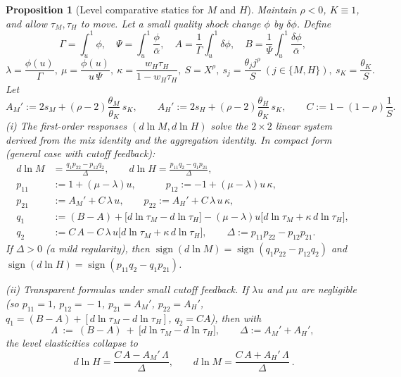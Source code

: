 \documentclass[english]{article}
\newtheorem{proposition}{Proposition}
\begin{document}
\begin{proposition}[Level comparative statics for $M$ and $H$]\label{prop:levels}
Maintain $\rho<0$, $K\equiv1$, and allow $\tau_M,\tau_H$ to move. Let a small quality shock change $\phi$ by $\delta\phi$.
Define
\[
\Gamma=\int_u^1\phi,\quad \Psi=\int_u^1\frac{\phi}{\bar\alpha},\quad
A=\frac{1}{\Gamma}\int_u^1\delta\phi,\quad B=\frac{1}{\Psi}\int_u^1\frac{\delta\phi}{\bar\alpha},
\]
\[
\lambda=\frac{\phi(u)}{\Gamma},\ \mu=\frac{\phi(u)}{u\,\Psi},\ 
\kappa=\frac{w_H\tau_H}{1-w_H\tau_H},\ 
S=X^\rho,\ 
s_j=\frac{\theta_j j^\rho}{S}\ (j\in\{M,H\}),\ s_K=\frac{\theta_K}{S}.
\]
Let
\[
A_M':=2s_M+(\rho-2)\frac{\theta_M}{\theta_K}\,s_K,\qquad
A_H':=2s_H+(\rho-2)\frac{\theta_H}{\theta_K}\,s_K,\qquad
C:=1-(1-\rho)\frac{1}{S}.
\]
(i) The first-order responses $(d\ln M,d\ln H)$ solve the $2\times2$ linear system derived from the
mix identity and the aggregation identity. In compact form (general case with cutoff feedback):
\[
\begin{aligned}
d\ln M&=\frac{q_1 p_{22}-p_{12}q_2}{\Delta},\qquad
d\ln H=\frac{p_{11}q_2-q_1 p_{21}}{\Delta},
\\[-2pt]
p_{11}&:=1+(\mu-\lambda)u,\qquad\quad
p_{12}:=-1+(\mu-\lambda)u\,\kappa,
\\[-2pt]
p_{21}&:=A_M'+C\,\lambda\,u,\qquad
p_{22}:=A_H'+C\,\lambda\,u\,\kappa,
\\[-2pt]
q_1&:=(B-A)+\big[d\ln\tau_M-d\ln\tau_H\big] - (\mu-\lambda)u\big[d\ln\tau_M+\kappa\,d\ln\tau_H\big],
\\[-2pt]
q_2&:=C\,A - C\,\lambda\,u\big[d\ln\tau_M+\kappa\,d\ln\tau_H\big],
\qquad
\Delta:=p_{11}p_{22}-p_{12}p_{21}.
\end{aligned}
\]
If $\Delta>0$ (a mild regularity), then $\operatorname{sign}(d\ln M)=\operatorname{sign}(q_1 p_{22}-p_{12}q_2)$ and
$\operatorname{sign}(d\ln H)=\operatorname{sign}(p_{11}q_2-q_1 p_{21})$.

(ii) \emph{Transparent formulas under small cutoff feedback.} 
If $\lambda u$ and $\mu u$ are negligible (so $p_{11}\!=\!1$, $p_{12}\!=\!-1$, $p_{21}\!=\!A_M'$, $p_{22}\!=\!A_H'$, $q_1\!=\!(B\!-\!A)+[d\ln\tau_M-d\ln\tau_H]$, $q_2\!=\!C A$), then with
\[
\Lambda\ :=\ (B-A)\ +\ \big[d\ln\tau_M-d\ln\tau_H\big],\qquad \Delta:=A_M'+A_H',
\]
the level elasticities collapse to
\[
\boxed{\ d\ln H=\frac{C\,A - A_M'\,\Lambda}{\Delta},\qquad
d\ln M=\frac{C\,A + A_H'\,\Lambda}{\Delta}\ }.
\]
\end{proposition}
\end{document}
